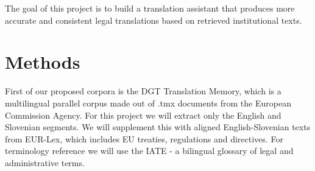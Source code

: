 \documentclass[fleqn,moreauthors,10pt]{ds_report}
\begin{document}
The goal of this project is to build a translation assistant that produces more accurate and consistent legal translations based on retrieved institutional texts. 

\section*{Methods}

First of our proposed corpora is the DGT Translation Memory, which is a multilingual parallel corpus made out of .tmx documents from the European Commission Agency\cite{DGT_Translation_Memory}. For this project we will extract only the English and Slovenian segments. We will supplement this with aligned English-Slovenian texts from EUR-Lex, which includes EU treaties, regulations and directives\cite{EUR-Lex}. For terminology reference we will use the IATE - a bilingual glossary of legal and administrative terms\cite{IATE_-_Interactive_Terminology_for_Europe}. 




\end{document}
